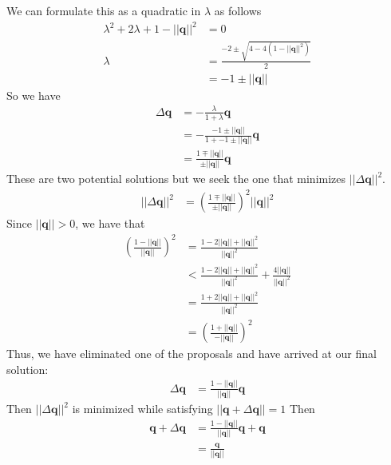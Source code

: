 \documentclass{article}
\begin{document}
We can formulate this as a quadratic in $\lambda$ as follows
\begin{align*}
	\lambda^2 + 2\lambda + 1 - || \pmb{q} ||^2 & = 0                                                          \\
	\lambda                                    & = \frac{-2 \pm \sqrt{4 - 4\left(1- ||\pmb{q}||^2\right)}}{2} \\
	                                           & = -1 \pm || \pmb{q} ||
\end{align*}
So we have
\begin{align*}
	\Delta \pmb{q} & = - \frac{\lambda}{1 + \lambda} \pmb{q}                           \\
	               & = - \frac{-1 \pm || \pmb{q} ||}{1 + -1 \pm || \pmb{q} ||} \pmb{q} \\
	               & = \frac{1 \mp || \pmb{q} || }{\pm || \pmb{q} ||} \pmb{q}
\end{align*}
These are two potential solutions but we seek the one that minimizes $|| \Delta \pmb{q} || ^2$.
\begin{align*}
	|| \Delta \pmb{q} ||^2 & = \left( \frac{1 \mp || \pmb{q} ||}{\pm || \pmb{q} ||} \right)^2 || \pmb{q} ||^2
\end{align*}
Since $|| \pmb{q} || > 0$, we have that
\begin{align*}
	\left( \frac{1 - ||\pmb{q}|| }{||\pmb{q}||} \right)^2 & = \frac{1 - 2 || \pmb{q} || + ||\pmb{q}||^2}{||\pmb{q}||^2}                                           \\
	                                                      & < \frac{1 - 2 || \pmb{q} || + ||\pmb{q}||^2}{||\pmb{q}||^2} + \frac{4 || \pmb{q} ||}{|| \pmb{q} ||^2} \\
	                                                      & = \frac{1 + 2 || \pmb{q} || + ||\pmb{q}||^2}{||\pmb{q}||^2}                                           \\
	                                                      & = \left( \frac{1 + ||\pmb{q}|| }{-||\pmb{q}||} \right)^2
\end{align*}
Thus, we have eliminated one of the proposals and have arrived at our final solution:
\begin{align}
	\Delta \pmb{q} & = \frac{1 - ||\pmb{q} ||}{|| \pmb{q} ||} \pmb{q}
\end{align}
Then $||\Delta \pmb{q}||^2$ is minimized while satisfying $|| \pmb{q} + \Delta \pmb{q} || = 1$
Then
\begin{align*}
	\pmb{q} + \Delta \pmb{q} & = \frac{1 - ||\pmb{q}||}{||\pmb{q}||} \pmb{q} + \pmb{q} \\
	                         & = \frac{\pmb{q}}{||\pmb{q}||}
\end{align*}
\end{document}
